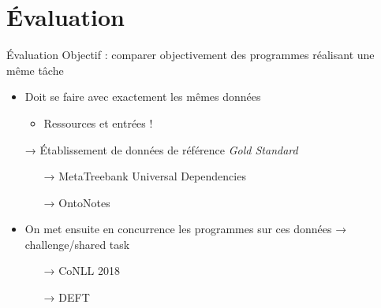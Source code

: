 \documentclass[../allslides.tex]{subfiles}
\begin{document}
\renewcommand\docdate{2020-01-30}  %




\section{Évaluation}

\begin{frame}{Évaluation}
	Objectif : comparer \alert{objectivement} des programmes réalisant une même tâche
	\begin{itemize}
		\item Doit se faire avec exactement les mêmes données
			\begin{itemize}
				\item Ressources et entrées !
			\end{itemize}
		\item[→] Établissement de données de référence \alert{\textit{Gold Standard}}
			\begin{itemize}
				\item[→] MetaTreebank Universal Dependencies 
				\item[→] OntoNotes 
			\end{itemize}
		\item On met ensuite en concurrence les programmes sur ces données → challenge/shared task
			\begin{itemize}
				\item[→] CoNLL 2018 
				\item[→] \alert{DEFT} 
			\end{itemize}
	\end{itemize}
\end{frame}
\end{document}
